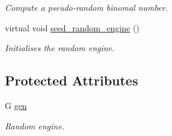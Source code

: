 \begin{DoxyCompactItemize}
\begin{DoxyCompactList}\small\item\em Compute a pseudo-\/random binomal number. \end{DoxyCompactList}\item 
\hypertarget{classlgraph_1_1utils_1_1random__generator_a4eb6998070eecb59bd89dca92d8a509c}{virtual void \hyperlink{classlgraph_1_1utils_1_1random__generator_a4eb6998070eecb59bd89dca92d8a509c}{seed\-\_\-random\-\_\-engine} ()}\label{classlgraph_1_1utils_1_1random__generator_a4eb6998070eecb59bd89dca92d8a509c}

\begin{DoxyCompactList}\small\item\em Initialises the random engine. \end{DoxyCompactList}\end{DoxyCompactItemize}
\subsection*{Protected Attributes}
\begin{DoxyCompactItemize}
\item 
\hypertarget{classlgraph_1_1utils_1_1random__generator_a18353876b4c2d3a18aee454b5750a0a0}{G \hyperlink{classlgraph_1_1utils_1_1random__generator_a18353876b4c2d3a18aee454b5750a0a0}{gen}}\label{classlgraph_1_1utils_1_1random__generator_a18353876b4c2d3a18aee454b5750a0a0}

\begin{DoxyCompactList}\small\item\em Random engine. \end{DoxyCompactList}\end{DoxyCompactItemize}
